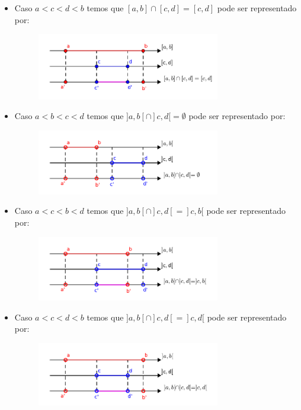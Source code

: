 \begin{itemize}
  \item Caso $a< c< d< b$ temos que $[a, b] \cap [c, d]= [c, d]$ pode ser representado por:
  \begin{figure}[H]
 \centering
 \includegraphics[width=8cm]{./cap_conjnum/figs/intersecaoacdb}
 \end{figure}

 \item Caso $a< b< c< d$ temos que $]a, b[ \cap ]c, d[ = \emptyset$ pode ser representado por:
  \begin{figure}[H]
 \centering
 \includegraphics[width=8cm]{./cap_conjnum/figs/intersecao-a-b-c-d}
 \end{figure}

 \item Caso $a< c< b< d$ temos que $]a, b[ \cap ]c, d[= ]c, b[$ pode ser representado por:
  \begin{figure}[H]
 \centering
 \includegraphics[width=8cm]{./cap_conjnum/figs/intersecaoa-c-bd}
 \end{figure}

   \item Caso $a< c< d< b$ temos que $]a, b[ \cap ]c, d[= ]c, d[$ pode ser representado por:
  \begin{figure}[H]
 \centering
 \includegraphics[width=8cm]{./cap_conjnum/figs/intersecaoa-c-db}
 \end{figure}


\end{itemize}
